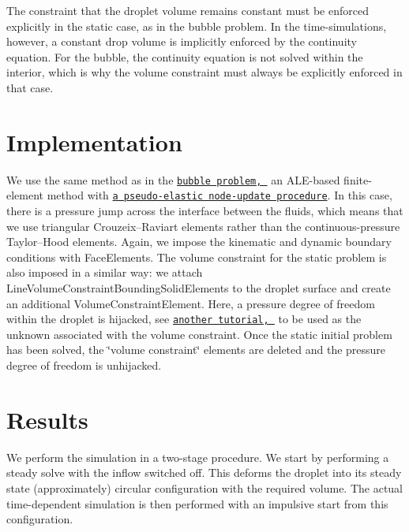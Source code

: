 The constraint that the droplet volume remains constant must be enforced explicitly in the static case, as in the bubble problem. In the time-\/simulations, however, a constant drop volume is implicitly enforced by the continuity equation. For the bubble, the continuity equation is not solved within the interior, which is why the volume constraint must always be explicitly enforced in that case.



 

\hypertarget{index_implementation}{}\section{Implementation}\label{index_implementation}
We use the same method as in the \href{../../adaptive_bubble_in_channel/html/index.html}{\tt bubble problem, } an A\+L\+E-\/based finite-\/element method with \href{../../single_layer_free_surface/html/index.html#kinematic_condition_implementation}{\tt a pseudo-\/elastic node-\/update procedure}. In this case, there is a pressure jump across the interface between the fluids, which means that we use triangular Crouzeix--Raviart elements rather than the continuous-\/pressure Taylor--Hood elements. Again, we impose the kinematic and dynamic boundary conditions with {\ttfamily Face\+Elements}. The volume constraint for the static problem is also imposed in a similar way\+: we attach {\ttfamily Line\+Volume\+Constraint\+Bounding\+Solid\+Elements} to the droplet surface and create an additional {\ttfamily Volume\+Constraint\+Element}. Here, a pressure degree of freedom within the droplet is hijacked, see \href{../../static_two_layer/html/index.html}{\tt another tutorial, } to be used as the unknown associated with the volume constraint. Once the static initial problem has been solved, the \char`\"{}volume constraint\char`\"{} elements are deleted and the pressure degree of freedom is unhijacked.



 

\hypertarget{index_results}{}\section{Results}\label{index_results}
We perform the simulation in a two-\/stage procedure. We start by performing a steady solve with the inflow switched off. This deforms the droplet into its steady state (approximately) circular configuration with the required volume. The actual time-\/dependent simulation is then performed with an impulsive start from this configuration.

